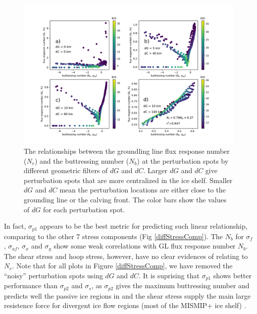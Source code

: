 \documentclass[review,oneside]{igs}
\begin{document}
\begin{figure}
\centering
\includegraphics[width=1\linewidth]{figs/diffdCdG.pdf}
\caption{The relationships between the groundling line flux response number ($N_r$) and the buttressing number ($N_b$) at the perturbation spots by different geometric filters of $dG$ and $dC$. Larger $dG$ and $dC$ give perturbation spots that are more centralized in the ice shelf. Smaller $dG$ and $dC$ mean the perturbation locations are either close to the grounding line or the calving front. The color bars show the values of $dG$ for each perturbation spot.}

\label{diffdCdG}
\end{figure}

In fact, $\sigma_{p1}$ appears to be the best metric for predicting such linear relationship, comparing to the other 7 stress components (Fig \ref{diffStressComp}). The $N_b$ for $\sigma_f$, $\sigma_{af}$, $\sigma_x$ and $\sigma_y$ show some weak correlations with GL flux response number $N_b$. The shear stress and hoop stress, however, have no clear evidences of relating to $N_r$. Note that for all plots in Figure \ref{diffStressComp}, we have removed the ``noisy'' perturbation spots using $dG$ and $dC$. It is suprising that $\sigma_{p1}$ shows better performance than $\sigma_{p2}$ and $\sigma_s$, as $\sigma_{p2}$ gives the maximum buttressing number and predicts well the passive ice regions in \cite{furst2016} and the shear stress supply the main large resistence force for divergent ice flow regions (most of the MISMIP+ ice shelf) \citep{wearing2016}.
\end{document}

